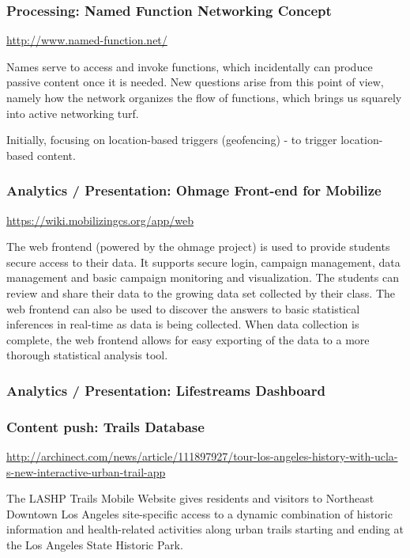 \subsubsection{Processing: Named Function Networking Concept}

\url{http://www.named-function.net/}

Names serve to access and invoke functions, which incidentally can produce passive content once it is needed. New questions arise from this point of view, namely how the network organizes the flow of functions, which brings us squarely into active networking turf. 

Initially, focusing on location-based triggers (geofencing) - to trigger location-based content.

\subsubsection{Analytics / Presentation: Ohmage Front-end for Mobilize}

\url{https://wiki.mobilizingcs.org/app/web}

The web frontend (powered by the ohmage project) is used to provide students secure access to their data. It supports secure login, campaign management, data management and basic campaign monitoring and visualization. The students can review and share their data to the growing data set collected by their class. The web frontend can also be used to discover the answers to basic statistical inferences in real-time as data is being collected. When data collection is complete, the web frontend allows for easy exporting of the data to a more thorough statistical analysis tool. 

\subsubsection{Analytics / Presentation: Lifestreams Dashboard}

\cite{hsieh2013acm}

\subsubsection{Content push: Trails Database}

\url{http://archinect.com/news/article/111897927/tour-los-angeles-history-with-ucla-s-new-interactive-urban-trail-app}

The LASHP Trails Mobile Website gives residents and visitors to Northeast Downtown Los Angeles site-specific access to a dynamic combination of historic information and health-related activities along urban trails starting and ending at the Los Angeles State Historic Park. 

